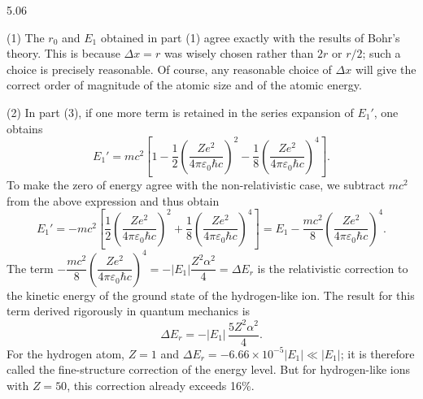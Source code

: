 \begin{solution}{5.06}
\begin{commentary}
(1) The $r_0$ and $E_1$ obtained in part (1) agree exactly with the results of Bohr's theory.
This is because $\Delta x = r$ was wisely chosen rather than $2r$ or $r/2$; such a choice is
precisely reasonable. Of course, any reasonable choice of $\Delta x$ will give the correct
order of magnitude of the atomic size and of the atomic energy.

(2) In part (3), if one more term is retained in the series expansion of $E_1'$, one obtains
\begin{equation*}
E_1' = mc^2\left[1 - \frac{1}{2}\left(\frac{Ze^2}{4\pi\varepsilon_0\hbar c}\right)^2
      - \frac{1}{8}\left(\frac{Ze^2}{4\pi\varepsilon_0\hbar c}\right)^4\right].
\end{equation*}
To make the zero of energy agree with the non-relativistic case, we subtract $mc^2$ from the
above expression and thus obtain
\begin{equation*}
E_1' = -mc^2\left[\frac{1}{2}\left(\frac{Ze^2}{4\pi\varepsilon_0\hbar c}\right)^2
      + \frac{1}{8}\left(\frac{Ze^2}{4\pi\varepsilon_0\hbar c}\right)^4\right]
     = E_1 - \frac{mc^2}{8}\left(\frac{Ze^2}{4\pi\varepsilon_0\hbar c}\right)^4.
\end{equation*}
The term $-\dfrac{mc^2}{8}\left(\dfrac{Ze^2}{4\pi\varepsilon_0\hbar c}\right)^4
= -|E_1|\dfrac{Z^2\alpha^2}{4} = \Delta E_r$ is the relativistic correction to the kinetic
energy of the ground state of the hydrogen-like ion. The result for this term derived
rigorously in quantum mechanics is
\begin{equation*}
\Delta E_r = -|E_1|\,\frac{5Z^2\alpha^2}{4}.
\end{equation*}
For the hydrogen atom, $Z = 1$ and $\Delta E_r = -6.66\times 10^{-5}|E_1| \ll |E_1|$; it is
therefore called the fine-structure correction of the energy level. But for hydrogen-like
ions with $Z = 50$, this correction already exceeds 16\%.
\end{commentary}
\end{solution}

